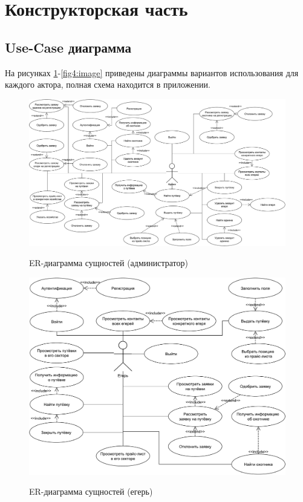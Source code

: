 \section{Конструкторская часть}	
	\subsection{Use-Case диаграмма}
	На рисунках \ref{fig2:image}-\ref{fig4:image} приведены диаграммы вариантов использования для каждого актора, полная схема находится в приложении.
	
	\begin{figure}[ph!]
		\centering
		\begin{center}
			{\includegraphics[scale=0.44, angle=90]{schemes/use-case_admin.pdf}}
			\caption{ER-диаграмма сущностей (администратор)}
			\label{fig2:image}
		\end{center}
	\end{figure}

	\begin{figure}[ph!]
		\centering
		\begin{center}
			{\includegraphics[scale=0.45]{schemes/use-case_huntsman.pdf}}
			\caption{ER-диаграмма сущностей (егерь)}
			\label{fig3:image}
		\end{center}
	\end{figure}

